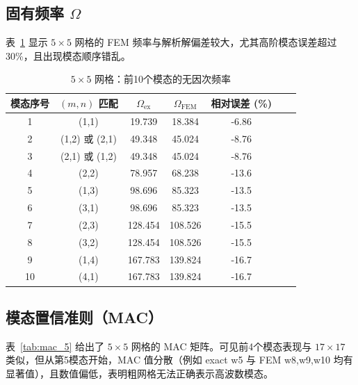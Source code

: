\documentclass[12pt,a4paper]{article}
\begin{document}
\subsection{固有频率 $\Omega$}
表~\ref{tab:omega_5} 显示 $5\times5$ 网格的 FEM 频率与解析解偏差较大，尤其高阶模态误差超过 30\%，且出现模态顺序错乱。

\begin{table}[htbp]
\centering
\caption{$5\times5$ 网格：前10个模态的无因次频率}
\label{tab:omega_5}
\begin{tabular}{ccccccc}
\toprule
模态序号 & $(m,n)$ 匹配 & $\Omega_{\text{ex}}$ & $\Omega_{\text{FEM}}$ & 相对误差 (\%) \\
\midrule
1 & (1,1) & 19.739 & 18.384 & -6.86 \\
2 & (1,2) 或 (2,1) & 49.348 & 45.024 & -8.76 \\
3 & (2,1) 或 (1,2) & 49.348 & 45.024 & -8.76 \\
4 & (2,2) & 78.957 & 68.238 & -13.6 \\
5 & (1,3) & 98.696 & 85.323 & -13.5 \\
6 & (3,1) & 98.696 & 85.323 & -13.5 \\
7 & (2,3) & 128.454 & 108.526 & -15.5 \\
8 & (3,2) & 128.454 & 108.526 & -15.5 \\
9 & (1,4) & 167.783 & 139.824 & -16.7 \\
10& (4,1) & 167.783 & 139.824 & -16.7 \\
\bottomrule
\end{tabular}
\end{table}

\subsection{模态置信准则（MAC）}
表~\ref{tab:mac_5} 给出了 $5\times5$ 网格的 MAC 矩阵。可见前4个模态表现与 $17\times17$ 类似，但从第5模态开始，MAC 值分散（例如 exact w5 与 FEM w8,w9,w10 均有显著值），且数值偏低，表明粗网格无法正确表示高波数模态。
\end{document}
